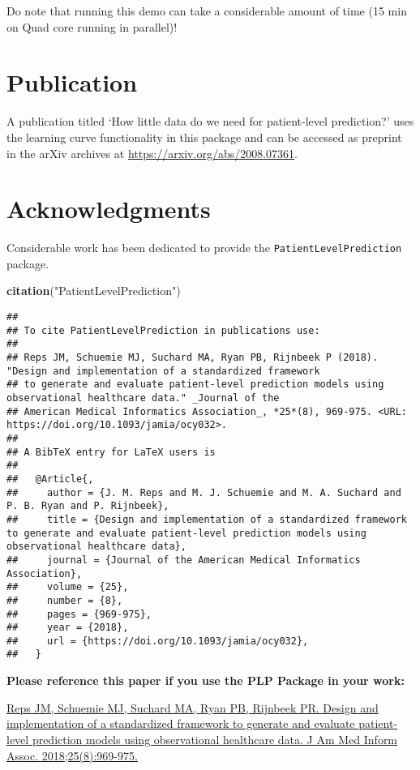 \documentclass[
]{article}
\newenvironment{Shaded}{\begin{snugshade}}{\end{snugshade}}
\newcommand{\KeywordTok}[1]{\textcolor[rgb]{0.13,0.29,0.53}{\textbf{#1}}}
\newcommand{\NormalTok}[1]{#1}
\newcommand{\StringTok}[1]{\textcolor[rgb]{0.31,0.60,0.02}{#1}}
\begin{document}
Do note that running this demo can take a considerable amount of time
(15 min on Quad core running in parallel)!

\hypertarget{publication}{%
\section{Publication}\label{publication}}

A publication titled `How little data do we need for patient-level
prediction?' uses the learning curve functionality in this package and
can be accessed as preprint in the arXiv archives at
\url{https://arxiv.org/abs/2008.07361}.

\hypertarget{acknowledgments}{%
\section{Acknowledgments}\label{acknowledgments}}

Considerable work has been dedicated to provide the
\texttt{PatientLevelPrediction} package.

\begin{Shaded}
\begin{Highlighting}[]
\KeywordTok{citation}\NormalTok{(}\StringTok{"PatientLevelPrediction"}\NormalTok{)}
\end{Highlighting}
\end{Shaded}

\begin{verbatim}
## 
## To cite PatientLevelPrediction in publications use:
## 
## Reps JM, Schuemie MJ, Suchard MA, Ryan PB, Rijnbeek P (2018). "Design and implementation of a standardized framework
## to generate and evaluate patient-level prediction models using observational healthcare data." _Journal of the
## American Medical Informatics Association_, *25*(8), 969-975. <URL: https://doi.org/10.1093/jamia/ocy032>.
## 
## A BibTeX entry for LaTeX users is
## 
##   @Article{,
##     author = {J. M. Reps and M. J. Schuemie and M. A. Suchard and P. B. Ryan and P. Rijnbeek},
##     title = {Design and implementation of a standardized framework to generate and evaluate patient-level prediction models using observational healthcare data},
##     journal = {Journal of the American Medical Informatics Association},
##     volume = {25},
##     number = {8},
##     pages = {969-975},
##     year = {2018},
##     url = {https://doi.org/10.1093/jamia/ocy032},
##   }
\end{verbatim}

\textbf{Please reference this paper if you use the PLP Package in your
work:}

\href{http://dx.doi.org/10.1093/jamia/ocy032}{Reps JM, Schuemie MJ,
Suchard MA, Ryan PB, Rijnbeek PR. Design and implementation of a
standardized framework to generate and evaluate patient-level prediction
models using observational healthcare data. J Am Med Inform Assoc.
2018;25(8):969-975.}
\end{document}

